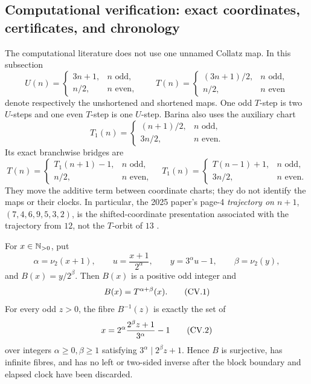 \subsection{Computational verification: exact coordinates, certificates, and chronology}
\label{subsec:computational-verification}

The computational literature does not use one unnamed Collatz map.  In this
subsection
\[
 U(n)=
 \begin{cases}
  3n+1,&n\text{ odd},\\
  n/2,&n\text{ even},
 \end{cases}
 \qquad
 T(n)=
 \begin{cases}
  (3n+1)/2,&n\text{ odd},\\
  n/2,&n\text{ even}
 \end{cases}
\]
denote respectively the unshortened and shortened maps.  One odd $T$-step is
two $U$-steps and one even $T$-step is one $U$-step.  Barina also uses the
auxiliary chart
\[
 T_1(n)=
 \begin{cases}
  (n+1)/2,&n\text{ odd},\\
  3n/2,&n\text{ even}.
 \end{cases}
\]
Its exact branchwise bridges are
\[
 T(n)=
 \begin{cases}T_1(n+1)-1,&n\text{ odd},\\ n/2,&n\text{ even},\end{cases}
 \quad
 T_1(n)=
 \begin{cases}T(n-1)+1,&n\text{ odd},\\3n/2,&n\text{ even}.
 \end{cases}
\]
They move the additive term between coordinate charts; they do not identify
the maps or their clocks.  In particular, the 2025 paper's page-4
\emph{trajectory on $n+1$}, $(7,4,6,9,5,3,2)$, is the shifted-coordinate
presentation associated with the trajectory from $12$, not the $T$-orbit
of $13$ \cite[pp.~2, 4]{Barina2025}.

\begin{proposition}
\label{prop:Barina-block-map}
For $x\in\mathbb{N}_{>0}$, put
\[
 \alpha=\nu_2(x+1),\qquad u=\frac{x+1}{2^\alpha},\qquad
 y=3^\alpha u-1,\qquad \beta=\nu_2(y),
\]
and $B(x)=y/2^\beta$.  Then $B(x)$ is a positive odd integer and
\begin{equation}
\stepcounter{equation}
\label{eq:Barina-block}
 B(x)=T^{\alpha+\beta}(x).
\tag{CV.1}
\end{equation}
For every odd $z>0$, the fibre $B^{-1}(z)$ is exactly the set of
\begin{equation}
\stepcounter{equation}
\label{eq:Barina-fibre}
 x=2^\alpha\frac{2^\beta z+1}{3^\alpha}-1
\tag{CV.2}
\end{equation}
over integers $\alpha\geq0,\beta\geq1$ satisfying
$3^\alpha\mid2^\beta z+1$.  Hence $B$ is surjective, has infinite fibres,
and has no left or two-sided inverse after the block boundary and elapsed
clock have been discarded.
\end{proposition}

